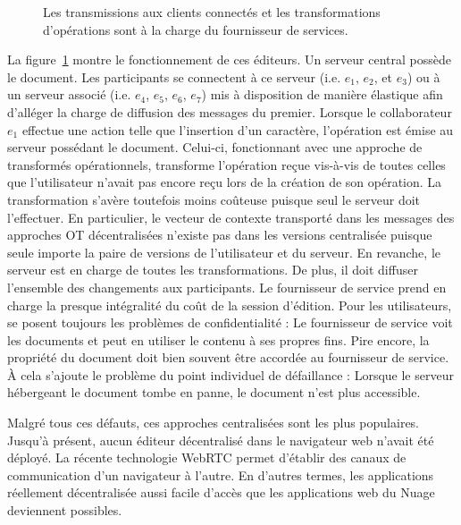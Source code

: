 \begin{figure}
  \begin{center}
    
    \caption[Fonctionnement des éditeurs centralisés]
    {\label{editor:fig:serviceprovider} Les transmissions aux clients connectés
      et les transformations d'opérations sont à la charge du fournisseur de
      services.}
  \end{center}
\end{figure}

La figure~\ref{editor:fig:serviceprovider} montre le fonctionnement de ces
éditeurs. Un serveur central possède le document. Les participants se connectent
à ce serveur (i.e. $e_1$, $e_2$, et $e_3$) ou à un serveur associé (i.e. $e_4$,
$e_5$, $e_6$, $e_7$) mis à disposition de manière élastique afin d'alléger la
charge de diffusion des messages du premier. Lorsque le collaborateur $e_1$
effectue une action telle que l'insertion d'un caractère, l'opération est émise
au serveur possédant le document. Celui-ci, fonctionnant avec une approche de
transformés opérationnels, transforme l'opération reçue vis-à-vis de toutes
celles que l'utilisateur n'avait pas encore reçu lors de la création de son
opération. La transformation s'avère toutefois moins coûteuse puisque seul le
serveur doit l'effectuer. En particulier, le vecteur de contexte transporté dans
les messages des approches OT décentralisées n'existe pas dans les versions
centralisée puisque seule importe la paire de versions de l'utilisateur et du
serveur. En revanche, le serveur est en charge de toutes les transformations. De
plus, il doit diffuser l'ensemble des changements aux participants. Le
fournisseur de service prend en charge la presque intégralité du coût de la
session d'édition. Pour les utilisateurs, se posent toujours les problèmes de
confidentialité : Le fournisseur de service voit les documents et peut en
utiliser le contenu à ses propres fins. Pire encore, la propriété du document
doit bien souvent être accordée au fournisseur de service. À cela s'ajoute le
problème du point individuel de défaillance : Lorsque le serveur hébergeant le
document tombe en panne, le document n'est plus accessible.

Malgré tous ces défauts, ces approches centralisées sont les plus populaires.
Jusqu'à présent, aucun éditeur décentralisé dans le navigateur web n'avait été
déployé. La récente technologie WebRTC permet d'établir des canaux de
communication d'un navigateur à l'autre. En d'autres termes, les applications
réellement décentralisée aussi facile d'accès que les applications web du Nuage
deviennent possibles.

